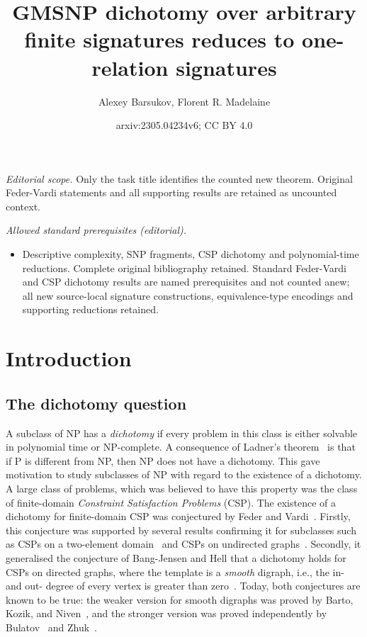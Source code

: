 \documentclass[10pt,a4paper]{amsart}
\title{GMSNP dichotomy over arbitrary finite signatures reduces to one-relation signatures}
\author{Alexey Barsukov, Florent R. Madelaine}
\date{arxiv:2305.04234v6; CC BY 4.0}
\theoremstyle{plain}
\theoremstyle{definition}
\numberwithin{equation}{section}
\begin{document}
\maketitle
\noindent\textit{Editorial scope.} Only the task title identifies the counted new theorem. Original Feder-Vardi statements and all supporting results are retained as uncounted context.\par\medskip
\noindent\textit{Allowed standard prerequisites (editorial).}\begin{itemize}
\item Descriptive complexity, SNP fragments, CSP dichotomy and polynomial-time reductions. Complete original bibliography retained. Standard Feder-Vardi and CSP dichotomy results are named prerequisites and not counted anew; all new source-local signature constructions, equivalence-type encodings and supporting reductions retained.
\end{itemize}\medskip
\section{Introduction}





\subsection{The dichotomy question}

A subclass of NP has a \emph{dichotomy} if every problem in this class is either solvable in polynomial time or NP-complete.
%
A consequence of Ladner's theorem~\cite{ladner1975} is that if P is different from NP, then NP does not have a dichotomy.
%
This gave motivation to study subclasses of NP with regard to the existence of a dichotomy.
%
A large class of problems, which was believed to have this property was the class of finite-domain \emph{Constraint Satisfaction Problems} (CSP).
%
The existence of a dichotomy for finite-domain CSP was conjectured by Feder and Vardi~\cite{federvardi1998}.
%
Firstly, this conjecture was supported by several results confirming it for subclasses such as CSPs on a two-element domain~\cite{schaefer1978} and CSPs on undirected graphs~\cite{hellnesetril1990}.
%
Secondly, it generalised the conjecture of Bang-Jensen and Hell that a dichotomy holds for CSPs on directed graphs, where the template is a \emph{smooth} digraph, i.e., the in- and out- degree of every vertex is greater than zero~\cite{bangjensen_hell1990}.
%
Today, both conjectures are known to be true: the weaker version for smooth digraphs was proved by Barto, Kozik, and Niven~\cite{barto_kozik_niven2009}, and the stronger version was proved independently by Bulatov~\cite{bulatov2017} and Zhuk~\cite{zhuk2020}.
%
\end{document}
